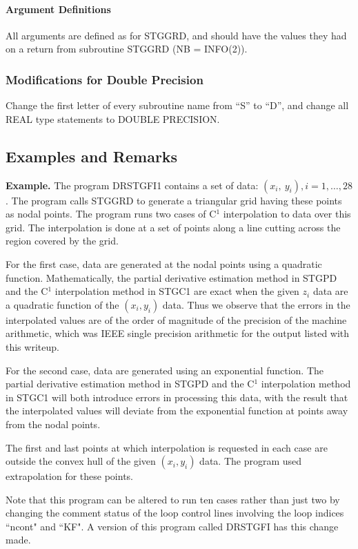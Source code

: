 \documentclass[twoside]{MATH77}
\begin{document}
\paragraph{Argument Definitions}

All arguments are defined as for STGGRD, and should have the values
they had on a return from subroutine STGGRD (NB = INFO(2)).

\subsubsection{Modifications for Double Precision}

Change the first letter of every subroutine name from ``S'' to ``D'', and
change all REAL type statements to DOUBLE PRECISION.

\subsection{Examples and Remarks}
{\bf Example.}
The program DRSTGFI1 contains a set of data:
$(x_i,\ y_i), i = 1, \ldots, 28$.  The program calls STGGRD
to generate a triangular grid having these points as
nodal points.  The program runs two cases of C$^1$ interpolation to data
over this grid.  The interpolation is done at a set of points along
a line cutting across the region covered by the grid.

For the first case, data are generated at the nodal points using a
quadratic function.  Mathematically, the partial derivative
estimation method in STGPD and the C$^1$ interpolation method
in STGC1 are exact when the given $z_i$ data are a quadratic
function of the $(x_i, y_i)$ data.
Thus we observe that the errors in
the interpolated values are of the order of magnitude of the
precision of the machine arithmetic, which was IEEE single
precision arithmetic for the output listed with this writeup.

For the second case, data are generated using an
exponential function.  The partial derivative
estimation method in STGPD and the C$^1$ interpolation method
in STGC1 will both introduce errors in processing this data,
with the result that the interpolated values
will deviate from
the exponential function at points away from the nodal points.

The first and last points at which interpolation is requested in each case
are outside the convex hull of the given $(x_i, y_i)$ data.  The program
used extrapolation for these points.

Note that this program can be altered to run ten cases rather than
just two by changing the comment status of the loop control lines
involving the loop indices ``ncont" and ``KF".  A version of this
program called DRSTGFI has this change made.
\end{document}

